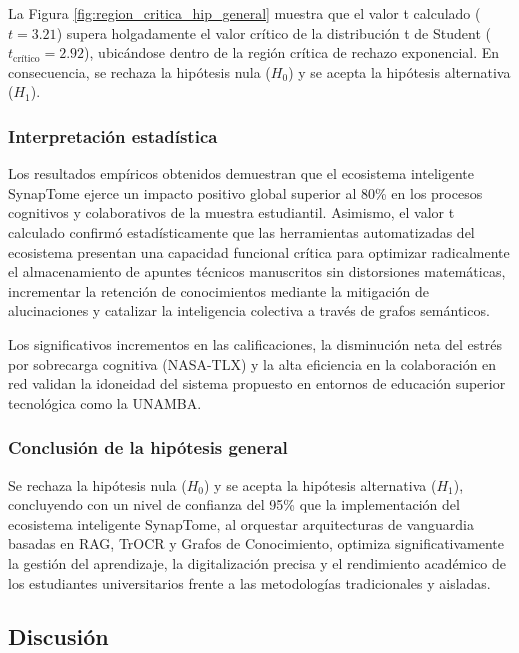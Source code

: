 \vspace{0.4cm}

La Figura \ref{fig:region_critica_hip_general} muestra que el valor t calculado (\(t = 3.21\)) supera holgadamente el valor crítico de la distribución t de Student (\(t_{\text{crítico}} = 2.92\)), ubicándose dentro de la región crítica de rechazo exponencial. En consecuencia, se rechaza la hipótesis nula (\(H_0\)) y se acepta la hipótesis alternativa (\(H_1\)).

\vspace{0.4cm}

\subsubsection{Interpretación estadística}
Los resultados empíricos obtenidos demuestran que el ecosistema inteligente SynapTome ejerce un impacto positivo global superior al 80\% en los procesos cognitivos y colaborativos de la muestra estudiantil. Asimismo, el valor t calculado confirmó estadísticamente que las herramientas automatizadas del ecosistema presentan una capacidad funcional crítica para optimizar radicalmente el almacenamiento de apuntes técnicos manuscritos sin distorsiones matemáticas, incrementar la retención de conocimientos mediante la mitigación de alucinaciones y catalizar la inteligencia colectiva a través de grafos semánticos.

Los significativos incrementos en las calificaciones, la disminución neta del estrés por sobrecarga cognitiva (NASA-TLX) y la alta eficiencia en la colaboración en red validan la idoneidad del sistema propuesto en entornos de educación superior tecnológica como la UNAMBA.

\vspace{0.4cm}

\subsubsection{Conclusión de la hipótesis general}
Se rechaza la hipótesis nula (\(H_0\)) y se acepta la hipótesis alternativa (\(H_1\)), concluyendo con un nivel de confianza del 95\% que la implementación del ecosistema inteligente SynapTome, al orquestar arquitecturas de vanguardia basadas en RAG, TrOCR y Grafos de Conocimiento, optimiza significativamente la gestión del aprendizaje, la digitalización precisa y el rendimiento académico de los estudiantes universitarios frente a las metodologías tradicionales y aisladas.

\vspace{0.4cm}

\subsection{Discusión}

